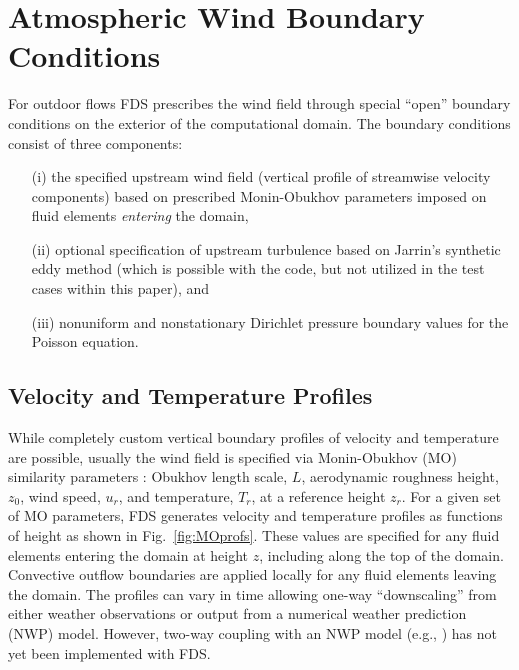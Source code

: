 \documentclass[journal,article,atmosphere,submit,moreauthors,pdftex]{Definitions/mdpi}
\begin{document}
\section{Atmospheric Wind Boundary Conditions}
\label{sec:wind}

For outdoor flows FDS prescribes the wind field through special ``open'' boundary conditions on the exterior of the computational domain.  The boundary conditions consist of three components:
\begin{enumerate}
\item[(i)] the specified upstream wind field (vertical profile of streamwise velocity components) based on prescribed Monin-Obukhov parameters imposed on fluid elements \emph{entering} the domain,
\item[(ii)] optional specification of upstream turbulence based on Jarrin's synthetic eddy method \cite{Jarrin:2008} (which is possible with the code, but not utilized in the test cases within this paper), and
\item[(iii)] nonuniform and nonstationary Dirichlet pressure boundary values for the Poisson equation.
\end{enumerate}

\subsection{Velocity and Temperature Profiles}
\label{sec:veltmpprof}

While completely custom vertical boundary profiles of velocity and temperature are possible, usually the wind field is specified via Monin-Obukhov (MO) similarity parameters \cite{Dyer:1974}: Obukhov length scale, $L$, aerodynamic roughness height, $z_0$, wind speed, $u_r$, and temperature, $T_r$, at a reference height $z_r$.  For a given set of MO parameters, FDS generates velocity and temperature profiles as functions of height as shown in Fig.~\ref{fig:MOprofs}. These values are specified for any fluid elements entering the domain at height $z$, including along the top of the domain.  Convective outflow boundaries are applied locally for any fluid elements leaving the domain.  The profiles can vary in time allowing one-way ``downscaling'' from either weather observations or output from a numerical weather prediction (NWP) model.  However, two-way coupling with an NWP model (e.g., \cite{Coen:2013,CAWFE}) has not yet been implemented with FDS.
\end{document}
